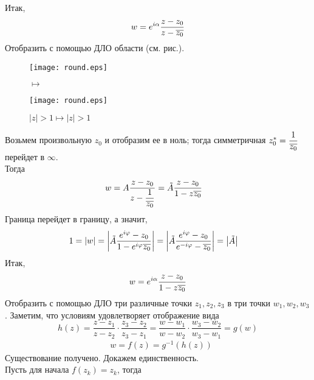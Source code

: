 Итак,
\begin{equation}\label{(23.6)}
    w = e^{i \alpha}\frac{z-z_0}{z-\overline{z_0}}
\end{equation}
\Example
Отобразить с помощью ДЛО области (см. рис.).
\\
\begin{figure}[h!]
    \begin{minipage}[c]{0.45\textwidth}
        \centering
        \texttt{[image: round.eps]}
    \end{minipage}
    \begin{minipage}[c]{0.1\textwidth}
        \centering
        \LARGE{$\mapsto$}
    \end{minipage}
    \begin{minipage}[c]{0.45\textwidth}
        \centering
        \texttt{[image: round.eps]}
        \label{fig:23.2}
    \end{minipage}
    \caption{$\left| z \right| > 1 \mapsto \left| z \right| > 1$}
\end{figure}
\nonum
Возьмем произвольную $z_0$ и отобразим ее в ноль; тогда симметричная $z_0^* =
\displaystyle \frac{1}{\overline{z_0}}$ перейдет в $\infty$.
\\
Тогда
\begin{align*}
    & w = A\frac{z-z_0}{z-\displaystyle \frac{1}{\overline{z_0}}} = \tilde{A}\frac{z-z_0}{1 - z\overline{z_0}}
\end{align*}
Граница перейдет в границу, а значит,
\begin{align*}
    & 1 = \left|{w}\right| = \left|{\tilde{A}\frac{e^{i \varphi}-z_0}{1 - e^{i \varphi}\overline{z_0}}}\right| = \left|{\tilde{A}\frac{e^{i \varphi}-z_0}{e^{-i \varphi}-\overline{z_0}}}\right| = \left|{\tilde{A}}\right|
\end{align*}
Итак,
\begin{equation}\label{(23.7)}
    w = e^{i \alpha}\frac{z-z_0}{1 - z\overline{z_0}}
\end{equation}
\Example
Отобразить с помощью ДЛО три различные точки $z_1, z_2, z_3$ в три точки $w_1,
w_2,w_3$.
\nonum
Заметим, что условиям удовлетворяет отображение вида
\begin{equation}\label{(23.8)}
    h(z) = \frac{z-z_1}{z-z_2} \cdot \frac{z_3-z_2}{z_3-z_1} = \frac{w-w_1}{w-w_2} \cdot \frac{w_3-w_2}{w_3-w_1} = g(w)
\end{equation}
\begin{align*}
  & w = f(z) = g^{-1}(h(z))
\end{align*}
Существование получено. Докажем единственность.
\\
Пусть для начала $f(z_k) = z_k$, тогда
